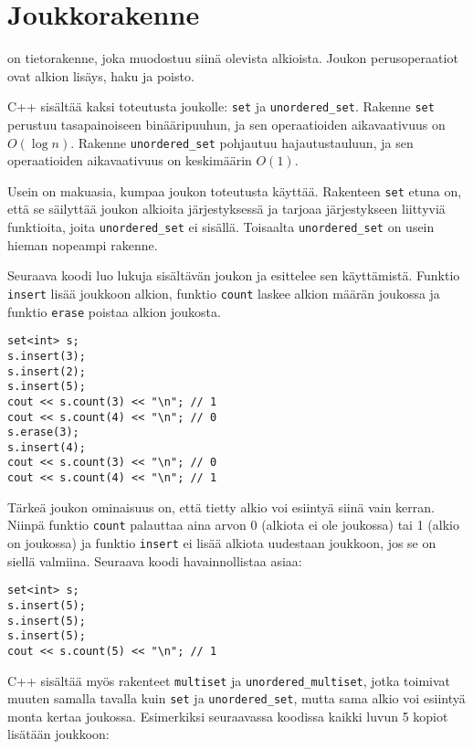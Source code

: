 \section{Joukkorakenne}



 on tietorakenne,
joka muodostuu siinä olevista alkioista.
Joukon perusoperaatiot ovat alkion lisäys,
haku ja poisto.

C++ sisältää kaksi
toteutusta joukolle: \texttt{set} ja \texttt{unordered\_set}.
Rakenne \texttt{set} perustuu tasapainoiseen
binääripuuhun, ja sen operaatioiden aikavaativuus
on $O(\log n)$.
Rakenne \texttt{unordered\_set} pohjautuu hajautustauluun,
ja sen operaatioiden aikavaativuus on keskimäärin $O(1)$.

Usein on makuasia, kumpaa joukon toteutusta käyttää.
Rakenteen \texttt{set} etuna on, että se säilyttää
joukon alkioita järjestyksessä ja tarjoaa
järjestykseen liittyviä funktioita,
joita \texttt{unordered\_set} ei sisällä.
Toisaalta \texttt{unordered\_set} on usein hieman nopeampi
rakenne.

Seuraava koodi luo lukuja sisältävän joukon ja
esittelee sen käyttämistä.
Funktio \texttt{insert} lisää joukkoon alkion,
funktio \texttt{count} laskee alkion määrän joukossa
ja funktio \texttt{erase} poistaa alkion joukosta.

\begin{lstlisting}
set<int> s;
s.insert(3);
s.insert(2);
s.insert(5);
cout << s.count(3) << "\n"; // 1
cout << s.count(4) << "\n"; // 0
s.erase(3);
s.insert(4);
cout << s.count(3) << "\n"; // 0
cout << s.count(4) << "\n"; // 1
\end{lstlisting}

Tärkeä joukon ominaisuus on,
että tietty alkio voi esiintyä siinä
vain kerran.
Niinpä funktio \texttt{count} palauttaa aina
arvon 0 (alkiota ei ole joukossa) tai 1 (alkio on joukossa)
ja funktio \texttt{insert} ei lisää alkiota
uudestaan joukkoon, jos se on siellä valmiina.
Seuraava koodi havainnollistaa asiaa:

\begin{lstlisting}
set<int> s;
s.insert(5);
s.insert(5);
s.insert(5);
cout << s.count(5) << "\n"; // 1
\end{lstlisting}


C++ sisältää myös rakenteet
\texttt{multiset} ja \texttt{unordered\_multiset},
jotka toimivat muuten samalla tavalla kuin \texttt{set}
ja \texttt{unordered\_set},
mutta sama alkio voi esiintyä
monta kertaa joukossa.
Esimerkiksi seuraavassa koodissa
kaikki luvun 5 kopiot lisätään joukkoon:

